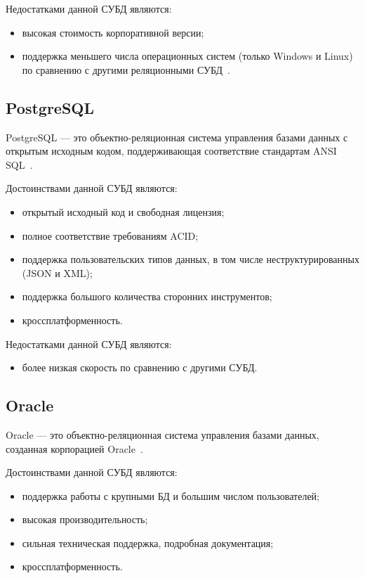 Недостатками данной СУБД являются:
\begin{itemize}
    \item высокая стоимость корпоративной версии;
    \item поддержка меньшего числа операционных систем (только Windows
        и Linux) по сравнению с другими реляционными СУБД~\cite{art07}.
\end{itemize}

\subsection{PostgreSQL}

PostgreSQL --- это объектно-реляционная система управления базами данных с
открытым исходным кодом, поддерживающая соответствие стандартам ANSI
SQL~\cite{site08}.

Достоинствами данной СУБД являются:
\begin{itemize}
    \item открытый исходный код и свободная лицензия;
    \item полное соответствие требованиям ACID;
    \item поддержка пользовательских типов данных, в том числе
        неструктурированных (JSON и XML);
    \item поддержка большого количества сторонних инструментов;
    \item кроссплатформенность.
\end{itemize}

Недостатками данной СУБД являются:
\begin{itemize}
    \item более низкая скорость по сравнению с другими СУБД.
\end{itemize}

\subsection{Oracle}

Oracle --- это объектно-реляционная система управления базами данных, созданная
корпорацией Oracle~\cite{site09}.

Достоинствами данной СУБД являются:
\begin{itemize}
    \item поддержка работы с крупными БД и большим числом пользователей;
    \item высокая производительность;
    \item сильная техническая поддержка, подробная документация;
    \item кроссплатформенность.
\end{itemize}

